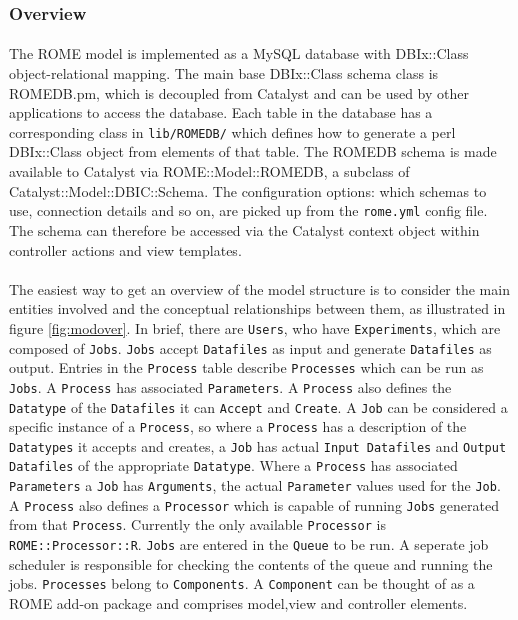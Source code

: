 \subsubsection{Overview}
\label{sec:model_overview}

\paragraph{}
The ROME model is implemented as a MySQL database with DBIx::Class object-relational mapping. The main base DBIx::Class schema class is ROMEDB.pm, which is decoupled from Catalyst and can be used by other applications to access the database.  Each table in the database has a corresponding class in \texttt{lib/ROMEDB/} which defines how to generate a perl DBIx::Class object from elements of that table. The ROMEDB schema is made available to Catalyst via ROME::Model::ROMEDB, a subclass of Catalyst::Model::DBIC::Schema. The configuration options: which schemas to use, connection details and so on, are picked up from the \texttt{rome.yml} config file. The schema can therefore be accessed via the Catalyst context object within controller actions and view templates. 

\paragraph{}
The easiest way to get an overview of the model structure is to consider the main entities involved and the conceptual relationships between them, as illustrated in figure \ref{fig:modover}. In brief, there are \texttt{Users}, who have \texttt{Experiments}, which are composed of \texttt{Jobs}. \texttt{Jobs} accept \texttt{Datafiles} as input and generate \texttt{Datafiles} as output. Entries in the \texttt{Process} table describe \texttt{Processes} which can be run as \texttt{Jobs}. A \texttt{Process} has associated \texttt{Parameters}. A \texttt{Process} also defines the \texttt{Datatype} of the \texttt{Datafiles} it can \texttt{Accept} and \texttt{Create}. A \texttt{Job} can be considered a specific instance of a \texttt{Process}, so where a \texttt{Process} has a description of the \texttt{Datatypes} it accepts and creates, a \texttt{Job} has actual \texttt{Input Datafiles} and \texttt{Output Datafiles} of the appropriate \texttt{Datatype}. Where a \texttt{Process} has associated \texttt{Parameters} a \texttt{Job} has \texttt{Arguments}, the actual \texttt{Parameter} values used for the \texttt{Job}. A \texttt{Process} also defines a \texttt{Processor} which is capable of running \texttt{Jobs} generated from that \texttt{Process}. Currently the only available \texttt{Processor} is \texttt{ROME::Processor::R}. \texttt{Jobs} are entered in the \texttt{Queue} to be run. A seperate job scheduler is responsible for checking the contents of the queue and running the jobs. \texttt{Processes} belong to \texttt{Components}. A \texttt{Component} can be thought of as a ROME add-on package and comprises model,view and controller elements. 

